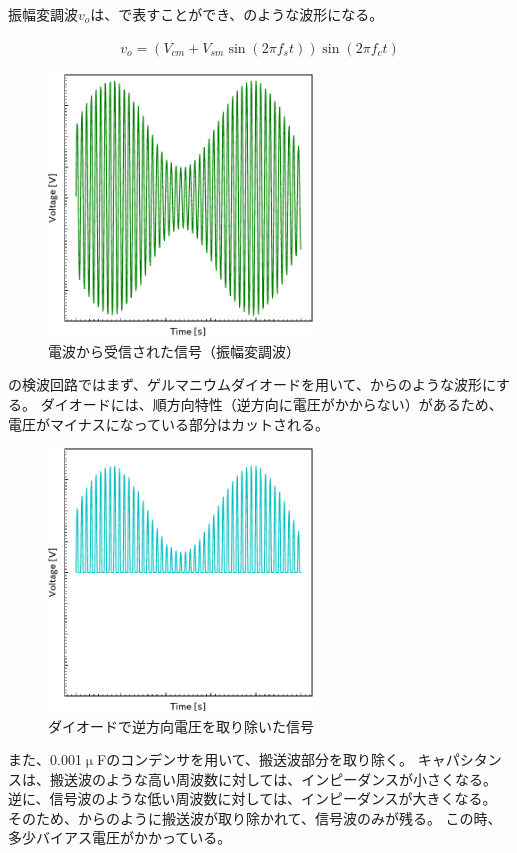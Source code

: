 \documentclass[report.tex]{subfiles}
\begin{document}
振幅変調波\(v_o\)は、で表すことができ、のような波形になる。

\begin{align}
	v_o = (V_{cm} + V_{sm} \sin(2 \pi f_s t)) \sin(2 \pi f_c t) \label{eq:v_o}
\end{align}

\begin{figure}[H]
	\centering
	\includegraphics[width=7cm]{fig/Wave.pdf}
	\caption{電波から受信された信号（振幅変調波）}
	\label{fig:wave}
\end{figure}

の検波回路ではまず、ゲルマニウムダイオードを用いて、からのような波形にする。
ダイオードには、順方向特性（逆方向に電圧がかからない）があるため、電圧がマイナスになっている部分はカットされる\cite{電子回路}。

\begin{figure}[H]
	\centering
	\includegraphics[width=7cm]{fig/diode.pdf}
	\caption{ダイオードで逆方向電圧を取り除いた信号}
	\label{fig:diode}
\end{figure}

また、0.001\(\upmu\)Fのコンデンサを用いて、搬送波部分を取り除く。
キャパシタンスは、搬送波のような高い周波数に対しては、インピーダンスが小さくなる。
逆に、信号波のような低い周波数に対しては、インピーダンスが大きくなる。
そのため、からのように搬送波が取り除かれて、信号波のみが残る。
この時、多少バイアス電圧がかかっている。
\end{document}
